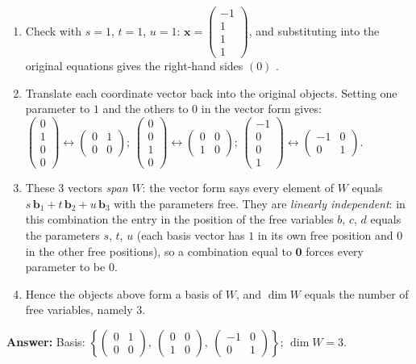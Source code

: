 \documentclass[11pt]{article}
\begin{document}
\begin{tcolorbox}[breakable,colback=ans,colframe=ansb,boxrule=0.5pt,left=4pt,right=4pt,top=2pt,bottom=2pt]
\begin{enumerate}[leftmargin=3.1em,itemsep=1pt,topsep=1pt,label=\textbf{Step \arabic*.}]
\item Check with $s=1$, $t=1$, $u=1$: $\mathbf x=\begin{pmatrix}-1\\1\\1\\1\end{pmatrix}$, and substituting into the original equations gives the right-hand sides $(0)$ \checkmark.
\item Translate each coordinate vector back into the original objects. Setting one parameter to $1$ and the others to $0$ in the vector form gives: $\begin{pmatrix}0\\1\\0\\0\end{pmatrix}\leftrightarrow \begin{pmatrix}0 & 1 \\ 0 & 0\end{pmatrix}$; $\begin{pmatrix}0\\0\\1\\0\end{pmatrix}\leftrightarrow \begin{pmatrix}0 & 0 \\ 1 & 0\end{pmatrix}$; $\begin{pmatrix}-1\\0\\0\\1\end{pmatrix}\leftrightarrow \begin{pmatrix}-1 & 0 \\ 0 & 1\end{pmatrix}$.
\item These 3 vectors \emph{span} $W$: the vector form says every element of $W$ equals $s\,\mathbf b_1+t\,\mathbf b_2+u\,\mathbf b_3$ with the parameters free. They are \emph{linearly independent}: in this combination the entry in the position of the free variables $b$, $c$, $d$ equals the parameters $s$, $t$, $u$ (each basis vector has $1$ in its own free position and $0$ in the other free positions), so a combination equal to $\mathbf 0$ forces every parameter to be $0$.
\item Hence the objects above form a basis of $W$, and $\dim W$ equals the number of free variables, namely $3$.
\end{enumerate}\textbf{Answer:} Basis: $\left\{\begin{pmatrix}0 & 1 \\ 0 & 0\end{pmatrix},\ \begin{pmatrix}0 & 0 \\ 1 & 0\end{pmatrix},\ \begin{pmatrix}-1 & 0 \\ 0 & 1\end{pmatrix}\right\}$; $\dim W=3$.\end{tcolorbox}
\end{document}
